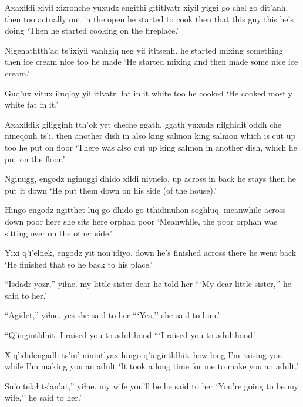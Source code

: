 \documentclass[12pt]{article}
\begin{document}
\gll Axaxiɬdi xiyiɬ xizronche yuxudz engithi          gititlvatr  xiyiɬ yiggi go   chel go   dit'anh.
then     too   actually  {}     {out in the open} {he started to cook} then that  this guy  this {he's doing}
\glt `Then he started cooking on the fireplace.'
\glend

\gll Nigenathtth'aq      ts'ixiyiɬ vanhgiq   neg  yiɬ itltsenh.
{he started mixing something} then       {ice cream} nice too {he made}
\glt `He started mixing and then made some nice ice cream.'
\glend

\gll Guq'ux vitux iluq'oy yiɬ itlvatr.
fat    {in it} {white} too {he cooked}
\glt `He cooked mostly white fat in it.'
\glend

\gll Axaxiɬdik giɬigginh tth'ok yet cheche ggath,  ggath       yuxudz niɬghidit'oddh che nineqonh ts'i. 
then      another  dish   in  also    {king salmon}  {king salmon} {}   {which is cut up}    too {he put on floor}
\glt `There was also cut up king salmon in another dish, which he put on the floor.'
\glend

\gll Nginugg, engodz nginuggi dhido xiɬdi niynelo.
up      across {in back} {he stays } then  {he put it down}
\glt `He put them down on his side (of the house).'
\glend

\gll Hingo     engodz ngitthet luq  go   dhido    go   tthidinuhon soghluq.
meanwhile across down     poor here {she sits} here orphan      poor
\glt `Meanwhile, the poor orphan was sitting over on the other side.'
\glend

\gll Yixi q'i'elnek, engodz yit non'idiyo.
down {he's finished}  across there {he went back}
\glt `He finished that so he back to his place.'
\glend

\gll ``Isdadr           yozr,'' yiɬne.
{my little sister} dear {he told her}
\glt ```My dear little sister,'' he said to her.'
\glend

\gll ``Agidet,'' yiɬne.
yes {she said to her}
\glt ```Yes,'' she said to him.'
\glend

\gll ``Q'ingintldhit.
{{I raised you to adulthood}}
\glt ```I raised you to adulthood.'
\glend

\gll Xiq'ididengadh ts'in' ninintlyax      hingo q'ingintldhit.
{how long}     {}     {I'm raising you} while {I'm making you an adult}
\glt `It took a long time for me to make you an adult.'
\glend

\gll Su'o   telaɬ     ts'an'at,''   yiɬne.
{my wife} {you'll be} {} {he said to her}
\glt `You're going to be my wife,'' he said to her.'
\glend
\end{document}
